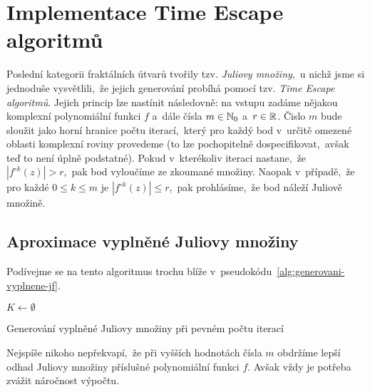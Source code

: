 \section{Implementace Time Escape algoritmů}\label{sec:implementace-tea}

Poslední kategorii fraktálních útvarů tvořily tzv. \emph{Juliovy množiny},~u nichž jsme si jednoduše vysvětlili,~že jejich generování probíhá pomocí tzv. \emph{Time Escape algoritmů}. Jejich princip lze nastínit následovně: na vstupu zadáme nějakou komplexní polynomiální funkci $f$ a~dále čísla $m\in\mathbb{N}_0$ a~$r\in\mathbb{R}$. Čislo $m$ bude sloužit jako horní hranice počtu iterací,~který pro každý bod v~určitě omezené oblasti komplexní roviny provedeme (to lze pochopitelně dospecifikovat,~avšak teď to není úplně podstatné). Pokud v~kterékoliv iteraci nastane,~že $|f^{\circ k}(z)|>r$,~pak bod vyloučíme ze zkoumané množiny. Naopak v~případě,~že pro každé $0\leqslant k\leqslant m$ je $|f^{\circ k}(z)|\leqslant r$,~pak prohlásíme,~že bod náleží Juliově množině.

\subsection{Aproximace vyplněné Juliovy množiny}\label{subsec:aproximace-vyplnene-juliovy-mnoziny}

Podívejme se na tento algoritmus trochu blíže v~pseudokódu~\ref{alg:generovani-vyplnene-jf}.
\begin{algorithm}
    $K\gets\emptyset$\;
    \;
    \caption{Generování vyplněné Juliovy množiny při pevném počtu iterací}
    \label{alg:generovani-vyplnene-jf}
\end{algorithm}
Nejspíše nikoho nepřekvapí,~že při vyšších hodnotách čísla $m$ obdržíme lepší odhad Juliovy množiny příslušné polynomiální funkci $f$. Avšak vždy je potřeba zvážit náročnost výpočtu.

